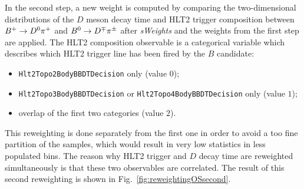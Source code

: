 In the second step, a new weight is computed by comparing the two-dimensional distributions of the $D$ meson decay time and HLT2 trigger composition between $B^+\rightarrow D^0\pi^+$ and $B^0\rightarrow D^\mp\pi^\pm$ after \emph{sWeights} and the weights from the first step are applied. The HLT2 composition observable is a categorical variable which describes which HLT2 trigger line has been fired by the $B$ candidate:
\begin{itemize}[noitemsep,topsep=0pt]
  \item \verb!Hlt2Topo2BodyBBDTDecision! only (value $0$);
  \item \verb!Hlt2Topo3BodyBBDTDecision! or \verb!Hlt2Topo4BodyBBDTDecision! only (value $1$);
  \item overlap of the first two categories (value $2$). 
\end{itemize} 
This reweighting is done separately from the first one in order to avoid a too fine partition of the samples, which would result in very low statistics in less populated bins. The reason why HLT2 trigger and $D$ decay time are reweighted simultaneously is that these two observables are correlated.
The result of this second reweighting is shown in Fig.~\ref{fig:reweightingOSsecond}.

